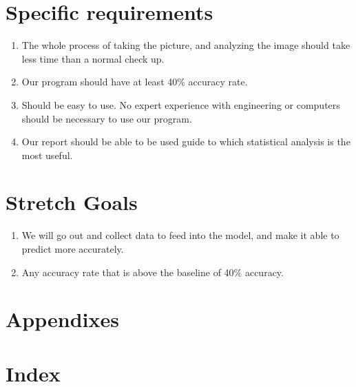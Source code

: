 \documentclass[10pt, draftclsnofoot, onecolumn]{IEEEtran}
\begin{document}
\section{Specific requirements}
	\begin{enumerate}
		\item The whole process of taking the picture, and analyzing the image should take less time than a normal check up.
		\item Our program should have at least 40\% accuracy rate.
		\item Should be easy to use. No expert experience with engineering or computers should be necessary to use our program.
		\item Our report should be able to be used guide to which statistical analysis is the most useful.
	\end{enumerate}
\section{Stretch Goals}
	\begin{enumerate}
		\item We will go out and collect data to feed into the model, and make it able to predict more accurately.
		\item Any accuracy rate that is above the baseline of 40\% accuracy.
	\end{enumerate}
\section*{Appendixes}
\section*{Index}
\end{document}
